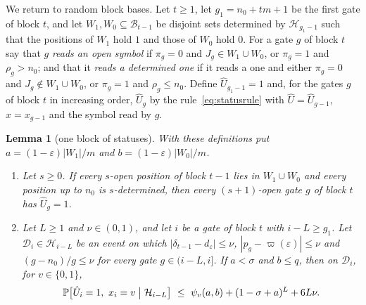 \documentclass[11pt]{amsart}
\newtheorem{lemma}[theorem]{Lemma}
\theoremstyle{definition}
\theoremstyle{remark}
\newcommand{\eps}{\varepsilon}
\newcommand{\PP}{\mathbb{P}}
\begin{document}
\medskip
We return to random block bases. Let $t\ge1$, let $g_1=n_0+tm+1$ be the first gate of block $t$,
and let $W_1,W_0\subseteq\mathcal B_{t-1}$ be disjoint sets determined by $\mathcal H_{g_1-1}$
such that the positions of $W_1$ hold $1$ and those of $W_0$ hold $0$. For a gate $g$ of block
$t$ say that $g$ \emph{reads an open symbol} if $\pi_g=0$ and $J_g\in W_1\cup W_0$, or $\pi_g=1$
and $\rho_g>n_0$; and that it \emph{reads a determined one} if it reads a one and either $\pi_g=0$
and $J_g\notin W_1\cup W_0$, or $\pi_g=1$ and $\rho_g\le n_0$. Define $\hat U_{g_1-1}=1$ and, for
the gates $g$ of block $t$ in increasing order, $\hat U_g$ by the rule~\eqref{eq:statusrule} with
$\hat U=\hat U_{g-1}$, $x=x_{g-1}$ and the symbol read by $g$.

\begin{lemma}[one block of statuses]\label{lem:statusblock}
With these definitions put $a=(1-\eps)|W_1|/m$ and $b=(1-\eps)|W_0|/m$.
\begin{enumerate}[label=(\alph*),leftmargin=2.4em]
\item Let $s\ge0$. If every $s$-open position of block $t-1$ lies in $W_1\cup W_0$ and every
position up to $n_0$ is $s$-determined, then every $(s+1)$-open gate $g$ of block $t$ has
$\hat U_g=1$.
\item Let $L\ge1$ and $\nu\in(0,1)$, and let $i$ be a gate of block $t$ with $i-L\ge g_1$. Let
$\mathcal D_i\in\mathcal H_{i-L}$ be an event on which $|\delta_{t-1}-d_\eps|\le\nu$,
$|p_g-\varpi(\eps)|\le\nu$ and $(g-n_0)/g\le\nu$ for every gate $g\in(i-L,i]$. If $a<\sigma$ and
$b\le q$, then on $\mathcal D_i$, for $v\in\{0,1\}$,
\[
\PP\bigl[\hat U_i=1,\ x_i=v\bigm|\mathcal H_{i-L}\bigr]\ \le\ \psi_v(a,b)+(1-\sigma+a)^L+6L\nu .
\]
\end{enumerate}
\end{lemma}
\end{document}
